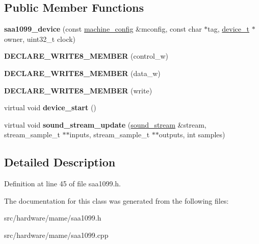 \subsection*{Public Member Functions}
\begin{DoxyCompactItemize}
\item 
\hypertarget{classsaa1099__device_a3fdd05697cef7dc0c55be1b728122f73}{{\bfseries saa1099\-\_\-device} (const \hyperlink{structmachine__config}{machine\-\_\-config} \&mconfig, const char $\ast$tag, \hyperlink{classdevice__t}{device\-\_\-t} $\ast$owner, uint32\-\_\-t clock)}\label{classsaa1099__device_a3fdd05697cef7dc0c55be1b728122f73}

\item 
\hypertarget{classsaa1099__device_aaf9c2cd63f3d241eade87b89a3b0ac93}{{\bfseries D\-E\-C\-L\-A\-R\-E\-\_\-\-W\-R\-I\-T\-E8\-\_\-\-M\-E\-M\-B\-E\-R} (control\-\_\-w)}\label{classsaa1099__device_aaf9c2cd63f3d241eade87b89a3b0ac93}

\item 
\hypertarget{classsaa1099__device_ac335014d54e7dfacbc72eadaadc6d4a9}{{\bfseries D\-E\-C\-L\-A\-R\-E\-\_\-\-W\-R\-I\-T\-E8\-\_\-\-M\-E\-M\-B\-E\-R} (data\-\_\-w)}\label{classsaa1099__device_ac335014d54e7dfacbc72eadaadc6d4a9}

\item 
\hypertarget{classsaa1099__device_a6d0ea25b9c3c12c422ce74987db0e385}{{\bfseries D\-E\-C\-L\-A\-R\-E\-\_\-\-W\-R\-I\-T\-E8\-\_\-\-M\-E\-M\-B\-E\-R} (write)}\label{classsaa1099__device_a6d0ea25b9c3c12c422ce74987db0e385}

\item 
\hypertarget{classsaa1099__device_af447e52803dbde64ff660759ad8ea839}{virtual void {\bfseries device\-\_\-start} ()}\label{classsaa1099__device_af447e52803dbde64ff660759ad8ea839}

\item 
\hypertarget{classsaa1099__device_a79e82e83fa9574f62daaf081d5a28959}{virtual void {\bfseries sound\-\_\-stream\-\_\-update} (\hyperlink{structdevice__sound__interface_1_1sound__stream}{sound\-\_\-stream} \&stream, stream\-\_\-sample\-\_\-t $\ast$$\ast$inputs, stream\-\_\-sample\-\_\-t $\ast$$\ast$outputs, int samples)}\label{classsaa1099__device_a79e82e83fa9574f62daaf081d5a28959}

\end{DoxyCompactItemize}


\subsection{Detailed Description}


Definition at line 45 of file saa1099.\-h.



The documentation for this class was generated from the following files\-:\begin{DoxyCompactItemize}
\item 
src/hardware/mame/saa1099.\-h\item 
src/hardware/mame/saa1099.\-cpp\end{DoxyCompactItemize}
